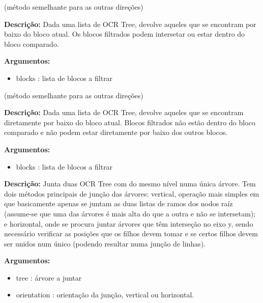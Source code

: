 (método semelhante para as outras direções)

\textbf{Descrição:} Dada uma lista de OCR Tree, devolve aqueles que se encontram por baixo do bloco atual. Os blocos filtrados podem intersetar ou estar dentro do bloco comparado.


\textbf{Argumentos:}
\begin{itemize}\setlength\itemsep{-0.3em}
	\item blocks : lista de blocos a filtrar
\end{itemize}



(método semelhante para as outras direções)

\textbf{Descrição:} Dada uma lista de OCR Tree, devolve aqueles que se encontram diretamente por baixo do bloco atual. Blocos filtrados não estão dentro do bloco comparado e não podem estar diretamente por baixo dos outros blocos.


\textbf{Argumentos:}
\begin{itemize}\setlength\itemsep{-0.3em}
	\item blocks : lista de blocos a filtrar
\end{itemize}
	
	
	

\textbf{Descrição:} Junta duas OCR Tree com do mesmo nível numa única árvore. Tem dois métodos principais de junção das árvores: vertical, operação mais simples em que basicamente apenas se juntam as duas listas de ramos dos nodos raíz (assume-se que uma das árvores é mais alta do que a outra e não se intersetam); e horizontal, onde se procura juntar árvores que têm interseção no eixo y, sendo necessário verificar as posições que os filhos devem tomar e se certos filhos devem ser unidos num único (podendo resultar numa junção de linhas).



\textbf{Argumentos:}
\begin{itemize}\setlength\itemsep{-0.3em}
	\item tree : árvore a juntar
	\item orientation : orientação da junção, vertical ou horizontal.
\end{itemize}


